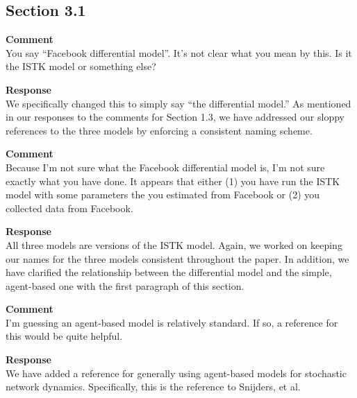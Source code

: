 \subsection{Section 3.1}
\setcounter{rev2-3.1}{1}

\textbf{Comment } \\
You say ``Facebook differential model''.
It's not clear what you mean by this.
Is it the ISTK model or something else?

\textbf{Response } \\
We specifically changed this to simply say ``the differential model.''
As mentioned in our responses to the comments for Section 1.3, we have addressed our sloppy references to the three models by enforcing a consistent naming scheme.

\textbf{Comment } \\
Because I'm not sure what the Facebook differential model is, I'm not sure exactly what you have done.
It appears that either (1) you have run the ISTK model with some parameters the you estimated from Facebook or (2) you collected data from Facebook.

\textbf{Response } \\
All three models are versions of the ISTK model.
Again, we worked on keeping our names for the three models consistent throughout the paper.
In addition, we have clarified the relationship between the differential model and the simple, agent-based one with the first paragraph of this section.

\textbf{Comment } \\
I'm guessing an agent-based model is relatively standard.
If so, a reference for this would be quite helpful.

\textbf{Response } \\
We have added a reference for generally using agent-based models for stochastic network dynamics.
Specifically, this is the reference to Snijders, et al.
